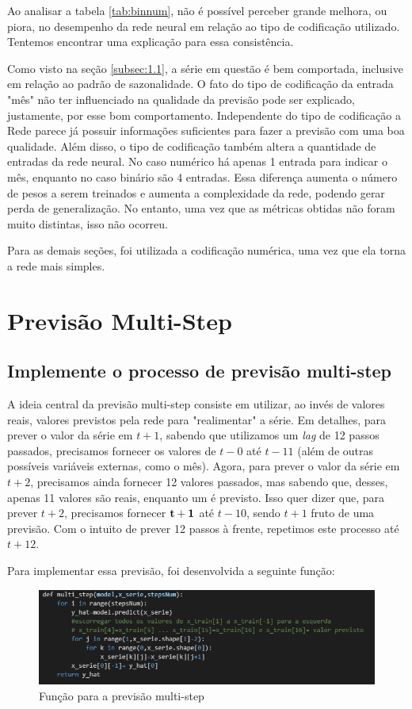 \documentclass[12pt]{article}
\begin{document}
	Ao analisar a tabela \ref{tab:binnum}, não é possível perceber grande melhora, ou piora, no desempenho da rede neural em relação ao tipo de codificação utilizado. Tentemos encontrar uma explicação para essa consistência. 
	
	Como visto na seção \ref{subsec:1.1}, a série em questão é bem comportada, inclusive em relação ao padrão de sazonalidade. O fato do tipo de codificação da entrada "mês"  não ter influenciado na qualidade da previsão pode ser explicado, justamente, por esse bom comportamento. Independente do tipo de codificação a Rede parece já possuir informações suficientes para fazer a previsão com uma boa qualidade. Além disso, o tipo de codificação também altera a quantidade de entradas da rede neural. No caso numérico há apenas 1 entrada para indicar o mês, enquanto no caso binário são 4 entradas. Essa diferença aumenta o número de pesos a serem treinados e aumenta a complexidade da rede, podendo gerar perda de generalização. No entanto, uma vez que as métricas obtidas não foram muito distintas, isso não ocorreu.
	
	Para as demais seções, foi utilizada a codificação numérica, uma vez que ela torna a rede mais simples.
	
	\section{Previsão Multi-Step}
	
	\subsection{Implemente o processo de previsão multi-step}\label{subsec:multi1}
	
	A ideia central da previsão multi-step consiste em utilizar, ao invés de valores reais, valores previstos pela rede para "realimentar" a série. Em detalhes, para prever o valor da série em $t+1$, sabendo que utilizamos um \textit{lag} de 12 passos passados, precisamos fornecer os valores de $t-0$ até $t-11$ (além de outras possíveis variáveis externas, como o mês). Agora, para prever o valor da série em $t+2$, precisamos ainda fornecer 12 valores passados, mas sabendo que, desses, apenas 11 valores são reais, enquanto um é previsto. Isso quer dizer que, para prever $t+2$, precisamos fornecer $\bf{t+1}$ até $t-10$, sendo $t+1$ fruto de uma previsão. Com o intuito de prever 12 passos à frente, repetimos este processo até $t+12$.
	
	Para implementar essa previsão, foi desenvolvida a seguinte função:
	\begin{figure}[H]
		\centering
		\includegraphics[width=0.7\linewidth]{Imagens/multistep/defmultistep}
		\caption{Função para a previsão multi-step}
		\label{fig:defmultistep}
	\end{figure}
	
\end{document}
